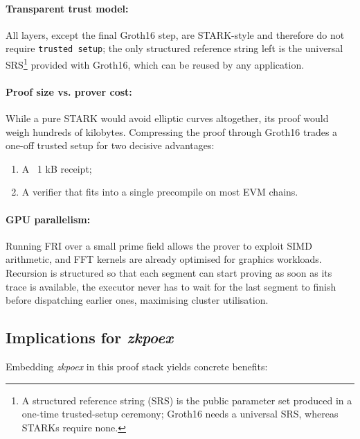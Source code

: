 \paragraph{Transparent trust model:}
All layers, except the final Groth16 step, are STARK-style and therefore do not require \texttt{trusted setup}; the only structured reference string left is the universal SRS\footnote{A structured reference string (SRS) is the public parameter set produced in a one-time trusted-setup ceremony; Groth16 needs a universal SRS, whereas STARKs require none.} provided with Groth16, which can be reused by any application. 

\paragraph{Proof size vs. prover cost:}
While a pure STARK would avoid elliptic curves altogether, its proof would weigh hundreds of kilobytes.  Compressing the proof through Groth16 trades a one-off trusted setup for two decisive advantages: 
\begin{enumerate}[label=(\roman*)]
    \item A ~1 kB receipt;
    \item A verifier that fits into a single precompile on most EVM chains.
\end{enumerate}

\paragraph{GPU parallelism:}
Running FRI over a small prime field allows the prover to exploit SIMD arithmetic, and FFT kernels are already optimised for graphics workloads. Recursion is structured so that each segment can start proving as soon as its trace is available, the executor never has to wait for the last segment to finish before dispatching earlier ones, maximising cluster utilisation.

\subsection{Implications for \textit{zkpoex}}

Embedding \textit{zkpoex} in this proof stack yields concrete benefits:

